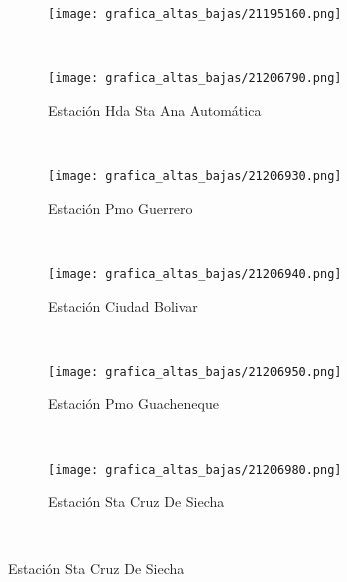 \begin{figure}[H]

    \centering


\begin{subfigure}[normla]{0.4\textwidth}
\texttt{[image: grafica\_altas\_bajas/21195160.png]}
\label{gra:tmp_tiba_2007_subia}
\end{subfigure}
~
\begin{subfigure}[normla]{0.4\textwidth}
\caption{Estación Hda Sta Ana Automática}
\texttt{[image: grafica\_altas\_bajas/21206790.png]}
\label{gra:tmp_tiba_2007_sta_ana}
\end{subfigure}
~
\begin{subfigure}[normla]{0.4\textwidth}
\caption{Estación Pmo Guerrero}
\texttt{[image: grafica\_altas\_bajas/21206930.png]}
\label{gra:tmp_tiba_2007_Pmo_guerrero}
\end{subfigure}
~
\begin{subfigure}[normla]{0.4\textwidth}
\caption{Estación Ciudad Bolivar}
\texttt{[image: grafica\_altas\_bajas/21206940.png]}
\label{gra:tmp_tiba_2007_cuidad_bolivar}
\end{subfigure}
~
\begin{subfigure}[normla]{0.4\textwidth}
\caption{Estación Pmo Guacheneque}
\texttt{[image: grafica\_altas\_bajas/21206950.png]}
\label{gra:tmp_tiba_2007_pmo_guacheneque}
\end{subfigure}
~
\begin{subfigure}[normla]{0.4\textwidth}
\caption{Estación Sta Cruz De Siecha}
\texttt{[image: grafica\_altas\_bajas/21206980.png]}
\label{gra:tmp_tiba_2007_cruz_siecha}
\end{subfigure}
~
\end{figure}
           
